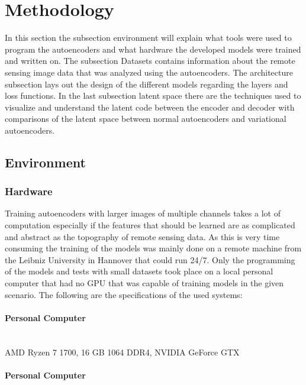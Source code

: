 \section{Methodology}

In this section the subsection environment will explain what tools were used to program the autoencoders
and what hardware the developed models were trained and written on. The subsection Datasets 
contains information about the remote sensing image data that was analyzed using the autoencoders. 
The architecture subsection lays out 
the design of the different models regarding the layers and loss functions. In the last subsection 
latent space there are the techniques used to visualize and understand the latent code between the 
encoder and decoder with comparisons of the latent space between normal autoencoders and variational
autoencoders.

\subsection{Environment}

\subsubsection{Hardware}

Training autoencoders with larger images of multiple channels takes a lot of computation especially if the 
features that should be learned are as complicated and abstract as the topography of remote sensing data.
As this is very time consuming the training of the models was mainly done on a remote machine from the
Leibniz University in Hannover that could run 24/7. Only the
programming of the models and tests with small datasets took place on a local personal computer that had no
GPU that was capable of training models in the given scenario. The following
are the specifications of the used systems:\\

\paragraph{Personal Computer} \mbox{} \smallskip \\

AMD Ryzen 7 1700, 16 GB 1064 DDR4, NVIDIA GeForce GTX

\paragraph{Personal Computer} \mbox{} \smallskip \\

